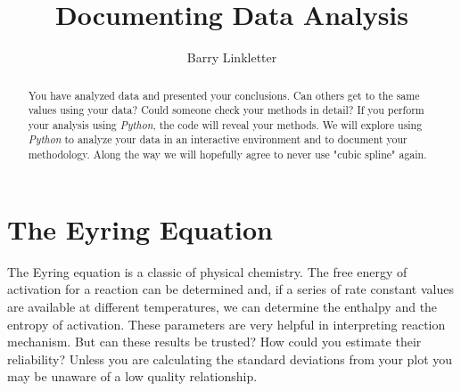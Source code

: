 \documentclass{tufte-handout}
\title{Documenting Data Analysis}
\author[Barry Linkletter]{Barry Linkletter}
\date{} %
\begin{document}
\justifying


\maketitle%

\begin{abstract}
You have analyzed data and presented your conclusions. Can others get to the same values using your data? Could someone check your methods in detail? If you perform your analysis using \textit{Python}, the code will reveal your methods. We will explore using \textit{Python} to analyze your data in an interactive environment and to document your methodology. Along the way we will hopefully agree to never use "cubic spline" again.
\noindent {}

\end{abstract}


\section{The Eyring Equation}

The Eyring equation is a classic of physical chemistry.
 The free energy of activation for a reaction can be determined and, if a series of rate constant values are available at different temperatures, we can determine the enthalpy and the entropy of activation. These parameters are very helpful in interpreting reaction mechanism. But can these results be trusted? How could you estimate their reliability? Unless you are calculating the standard deviations from your plot you may be unaware of a low quality relationship.
\end{document}
